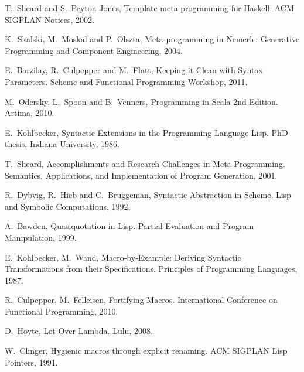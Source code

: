 \documentclass[10pt,journal,a4paper]{IEEEtran}
\begin{document}
\begin{thebibliography}{99}

T.~Sheard and S.~Peyton Jones,
Template meta-programming for Haskell.
ACM SIGPLAN Notices, 2002.

K.~Skalski, M.~Moskal and P.~Olszta,
Meta-programming in Nemerle.
Generative Programming and Component Engineering, 2004.

E.~Barzilay, R.~Culpepper and M.~Flatt,
Keeping it Clean with Syntax Parameters.
Scheme and Functional Programming Workshop, 2011.

M.~Odersky, L.~Spoon and B.~Venners,
Programming in Scala 2nd Edition.
Artima, 2010.

E.~Kohlbecker,
Syntactic Extensions in the Programming Language Lisp.
PhD thesis, Indiana University, 1986.

T.~Sheard,
Accomplishments and Research Challenges in Meta-Programming.
Semantics, Applications, and Implementation of Program Generation, 2001.




R.~Dybvig, R.~Hieb and  C.~Bruggeman,
Syntactic Abstraction in Scheme.
Lisp and Symbolic Computations, 1992.

A.~Bawden,
Quasiquotation in Lisp.
Partial Evaluation and Program Manipulation, 1999.

E.~Kohlbecker, M.~Wand,
Macro-by-Example: Deriving Syntactic Transformations from their Specifications.
Principles of Programming Languages, 1987.

R.~Culpepper, M.~Felleisen,
Fortifying Macros.
International Conference on Functional Programming, 2010.

D.~Hoyte,
Let Over Lambda.
Lulu, 2008.

W.~Clinger,
Hygienic macros through explicit renaming.
ACM SIGPLAN Lisp Pointers, 1991.


\end{thebibliography}
\end{document}
